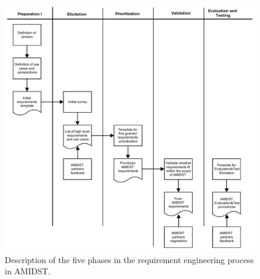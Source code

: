 \begin{figure}[htbp]
\centering
\includegraphics [keepaspectratio,width = 14cm] {amidst_re}
\caption{Description of the five phases in the requirement engineering process in AMIDST.}
\label{REprocess1}
\end{figure}







